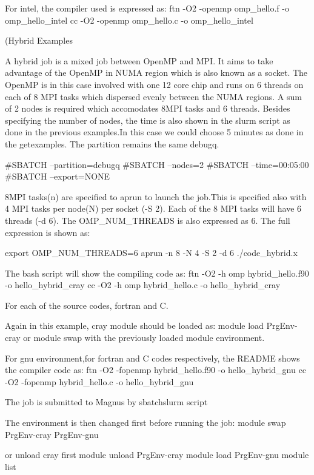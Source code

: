 \begin{Document}
{For intel, the compiler used is expressed as:
ftn -O2 -openmp omp_hello.f -o omp_hello_intel
cc -O2 -openmp omp_hello.c -o omp_hello_intel








\Subsubsection(Hybrid Examples}

A hybrid job is a mixed job between OpenMP and MPI. It aims to take advantage of the OpenMP in NUMA region which is also known as a socket.
The OpenMP is in this case involved with one 12 core chip and runs on 6 threads on each of 8 MPI tasks which dispersed evenly between the NUMA regions.
A sum of 2 nodes is required which accomodates 8MPI tasks and 6 threads.
Besides specifying the number of nodes, the time is also shown in the slurm script as done in the previous examples.In this case we could choose 5 minutes as done in the getexamples.
The partition remains the same debugq.

#SBATCH --partition=debugq
#SBATCH --nodes=2
#SBATCH --time=00:05:00
#SBATCH --export=NONE

8MPI tasks(n) are specified to aprun to launch the job.This is specified also with 4 MPI tasks per node(N) per socket (-S 2).
Each of the 8 MPI tasks will have 6 threads (-d 6). The OMP_NUM_THREADS is also expressed as 6.
The full expression is shown as:

export OMP_NUM_THREADS=6
aprun -n 8 -N 4 -S 2 -d 6 ./code_hybrid.x

The bash script will show the compiling code as:
ftn -O2 -h omp hybrid_hello.f90 -o hello_hybrid_cray
cc -O2 -h omp hybrid_hello.c -o hello_hybrid_cray

For each of the source codes, fortran and C.

Again in this example, cray module should be loaded as:
module load PrgEnv-cray or module swap with the previously loaded module environment.

For gnu environment,for fortran and C codes respectively, the README shows the compiler code as:
ftn -O2 -fopenmp hybrid_hello.f90 -o hello_hybrid_gnu
cc -O2 -fopenmp hybrid_hello.c -o hello_hybrid_gnu

The job is submitted to Magnus by sbatch{slurm script}

The environment is then changed first before running the job:
module swap PrgEnv-cray PrgEnv-gnu

or unload cray first
module unload PrgEnv-cray
module load PrgEnv-gnu
module list


\end{Document}
